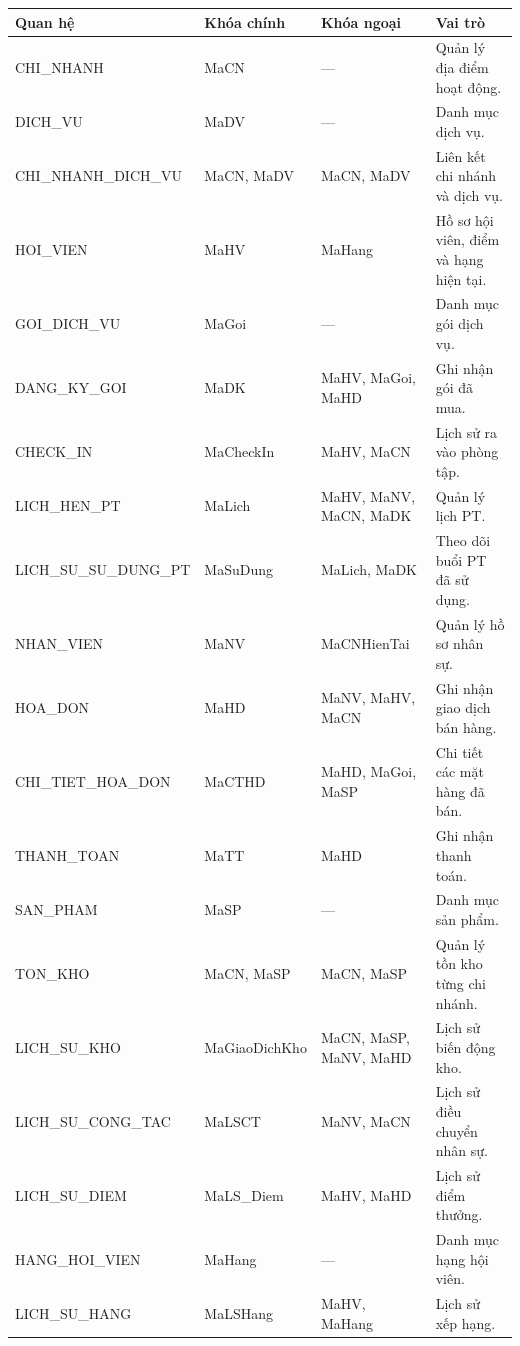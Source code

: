 \documentclass[11pt, a4paper]{article}
\begin{document}
\vspace{0.5em}
\begin{small}
\begin{tabularx}{\textwidth}{| C{3.8cm} | C{2.4cm} | C{4.2cm} | Y |}
\hline
\textbf{Quan hệ} & \textbf{Khóa chính} & \textbf{Khóa ngoại} & \textbf{Vai trò} \\
\hline
CHI\_NHANH & MaCN & --- & Quản lý địa điểm hoạt động. \\
\hline
DICH\_VU & MaDV & --- & Danh mục dịch vụ. \\
\hline
CHI\_NHANH\_DICH\_VU & MaCN, MaDV & MaCN, MaDV & Liên kết chi nhánh và dịch vụ. \\
\hline
HOI\_VIEN & MaHV & MaHang & Hồ sơ hội viên, điểm và hạng hiện tại. \\
\hline
GOI\_DICH\_VU & MaGoi & --- & Danh mục gói dịch vụ. \\
\hline
DANG\_KY\_GOI & MaDK & MaHV, MaGoi, MaHD & Ghi nhận gói đã mua. \\
\hline
CHECK\_IN & MaCheckIn & MaHV, MaCN & Lịch sử ra vào phòng tập. \\
\hline
LICH\_HEN\_PT & MaLich & MaHV, MaNV, MaCN, MaDK & Quản lý lịch PT. \\
\hline
LICH\_SU\_SU\_DUNG\_PT & MaSuDung & MaLich, MaDK & Theo dõi buổi PT đã sử dụng. \\
\hline
NHAN\_VIEN & MaNV & MaCNHienTai & Quản lý hồ sơ nhân sự. \\
\hline
HOA\_DON & MaHD & MaNV, MaHV, MaCN & Ghi nhận giao dịch bán hàng. \\
\hline
CHI\_TIET\_HOA\_DON & MaCTHD & MaHD, MaGoi, MaSP & Chi tiết các mặt hàng đã bán. \\
\hline
THANH\_TOAN & MaTT & MaHD & Ghi nhận thanh toán. \\
\hline
SAN\_PHAM & MaSP & --- & Danh mục sản phẩm. \\
\hline
TON\_KHO & MaCN, MaSP & MaCN, MaSP & Quản lý tồn kho từng chi nhánh. \\
\hline
LICH\_SU\_KHO & MaGiaoDichKho & MaCN, MaSP, MaNV, MaHD & Lịch sử biến động kho. \\
\hline
LICH\_SU\_CONG\_TAC & MaLSCT & MaNV, MaCN & Lịch sử điều chuyển nhân sự. \\
\hline
LICH\_SU\_DIEM & MaLS\_Diem & MaHV, MaHD & Lịch sử điểm thưởng. \\
\hline
HANG\_HOI\_VIEN & MaHang & --- & Danh mục hạng hội viên. \\
\hline
LICH\_SU\_HANG & MaLSHang & MaHV, MaHang & Lịch sử xếp hạng. \\
\hline
\end{tabularx}
\end{small}
\end{document}
